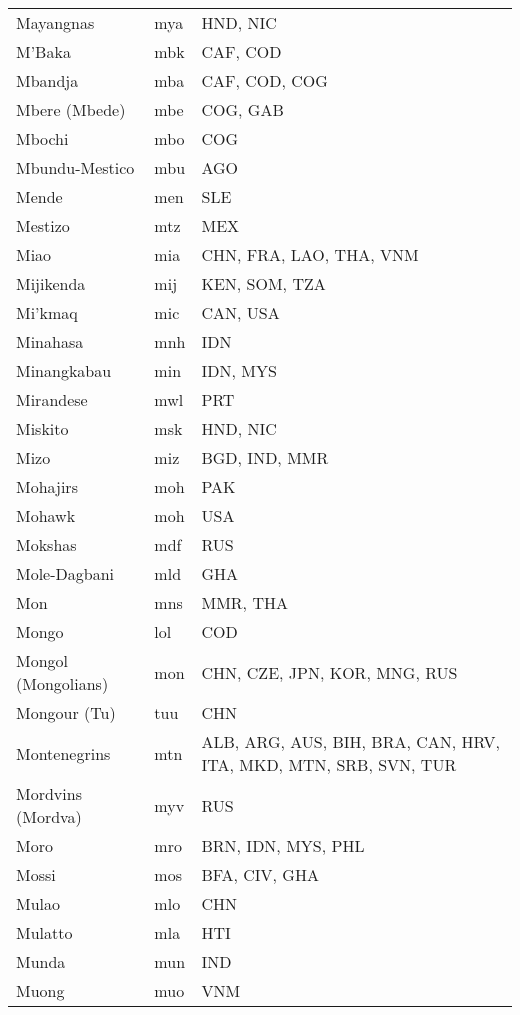 \documentclass[12pt]{article}
\begin{document}
\begin{center}
\begin{longtable}{|p{7cm}|p{1cm}|p{7cm}|}
Mayangnas	&	mya	&	HND, NIC	\\	\cline{1-3}
M'Baka	&	mbk	&	CAF, COD	\\	\cline{1-3}
Mbandja	&	mba	&	CAF, COD, COG	\\	\cline{1-3}
Mbere (Mbede)	&	mbe	&	COG, GAB	\\	\cline{1-3}
Mbochi	&	mbo	&	COG	\\	\cline{1-3}
Mbundu-Mestico	&	mbu	&	AGO	\\	\cline{1-3}
Mende	&	men 	&	SLE	\\	\cline{1-3}
Mestizo	&	mtz	&	MEX	\\	\cline{1-3}
Miao	&	mia	&	CHN, FRA, LAO, THA, VNM	\\	\cline{1-3}
Mijikenda	&	mij	&	KEN, SOM, TZA	\\	\cline{1-3}
Mi'kmaq	&	mic 	&	CAN, USA	\\	\cline{1-3}
Minahasa	&	mnh	&	IDN	\\	\cline{1-3}
Minangkabau	&	min 	&	IDN, MYS	\\	\cline{1-3}
Mirandese	&	mwl 	&	PRT	\\	\cline{1-3}
Miskito	&	msk	&	HND, NIC	\\	\cline{1-3}
Mizo	&	miz	&	BGD, IND, MMR	\\	\cline{1-3}
Mohajirs	&	moh 	&	PAK	\\	\cline{1-3}
Mohawk	&	moh 	&	USA	\\	\cline{1-3}
Mokshas	&	mdf 	&	RUS	\\	\cline{1-3}
Mole-Dagbani	&	mld	&	GHA	\\	\cline{1-3}
Mon	&	mns	&	MMR, THA	\\	\cline{1-3}
Mongo	&	lol 	&	COD	\\	\cline{1-3}
Mongol (Mongolians)	&	mon	&	CHN, CZE, JPN, KOR, MNG, RUS	\\	\cline{1-3}
Mongour (Tu)	&	tuu	&	CHN	\\	\cline{1-3}
Montenegrins	&	mtn	&	ALB, ARG, AUS, BIH, BRA, CAN, HRV, ITA, MKD, MTN, SRB, SVN, TUR	\\	\cline{1-3}
Mordvins (Mordva)	&	myv 	&	RUS	\\	\cline{1-3}
Moro	&	mro	&	BRN, IDN, MYS, PHL	\\	\cline{1-3}
Mossi	&	mos 	&	BFA, CIV, GHA	\\	\cline{1-3}
Mulao	&	mlo	&	CHN	\\	\cline{1-3}
Mulatto	&	mla	&	HTI	\\	\cline{1-3}
Munda	&	mun 	&	IND	\\	\cline{1-3}
Muong	&	muo	&	VNM	\\	\cline{1-3}

\end{longtable}
\end{center}
\end{document}

